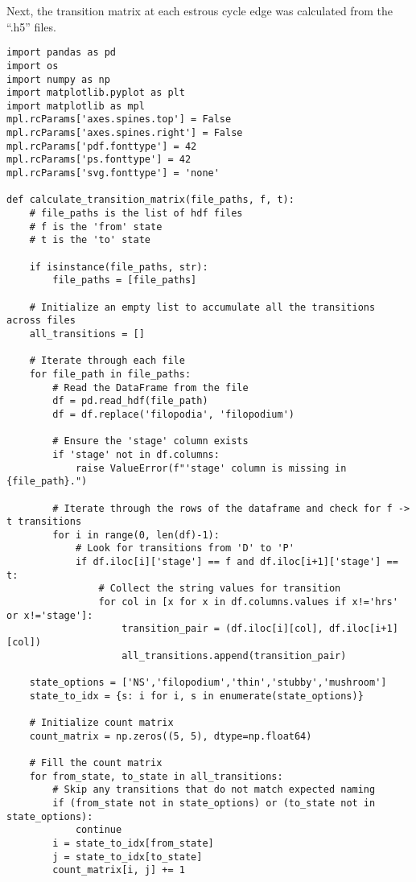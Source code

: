 \documentclass[11pt]{article}
\begin{document}
\normalsize
Next, the transition matrix at each estrous cycle edge was calculated from the ``.h5'' files.
\footnotesize
\begin{Verbatim}[frame=single]
import pandas as pd
import os
import numpy as np
import matplotlib.pyplot as plt
import matplotlib as mpl
mpl.rcParams['axes.spines.top'] = False
mpl.rcParams['axes.spines.right'] = False
mpl.rcParams['pdf.fonttype'] = 42
mpl.rcParams['ps.fonttype'] = 42
mpl.rcParams['svg.fonttype'] = 'none'

def calculate_transition_matrix(file_paths, f, t):
    # file_paths is the list of hdf files
    # f is the 'from' state
    # t is the 'to' state
     
    if isinstance(file_paths, str):
        file_paths = [file_paths]

    # Initialize an empty list to accumulate all the transitions across files
    all_transitions = []

    # Iterate through each file
    for file_path in file_paths:
        # Read the DataFrame from the file
        df = pd.read_hdf(file_path)
        df = df.replace('filopodia', 'filopodium')
        
        # Ensure the 'stage' column exists
        if 'stage' not in df.columns:
            raise ValueError(f"'stage' column is missing in {file_path}.")
        
        # Iterate through the rows of the dataframe and check for f -> t transitions
        for i in range(0, len(df)-1):
            # Look for transitions from 'D' to 'P'
            if df.iloc[i]['stage'] == f and df.iloc[i+1]['stage'] == t:
                # Collect the string values for transition
                for col in [x for x in df.columns.values if x!='hrs' or x!='stage']:
                    transition_pair = (df.iloc[i][col], df.iloc[i+1][col])
                    all_transitions.append(transition_pair)

    state_options = ['NS','filopodium','thin','stubby','mushroom']
    state_to_idx = {s: i for i, s in enumerate(state_options)}

    # Initialize count matrix
    count_matrix = np.zeros((5, 5), dtype=np.float64)

    # Fill the count matrix
    for from_state, to_state in all_transitions:
        # Skip any transitions that do not match expected naming
        if (from_state not in state_options) or (to_state not in state_options):
            continue
        i = state_to_idx[from_state]
        j = state_to_idx[to_state]
        count_matrix[i, j] += 1


\end{Verbatim}
\end{document}
